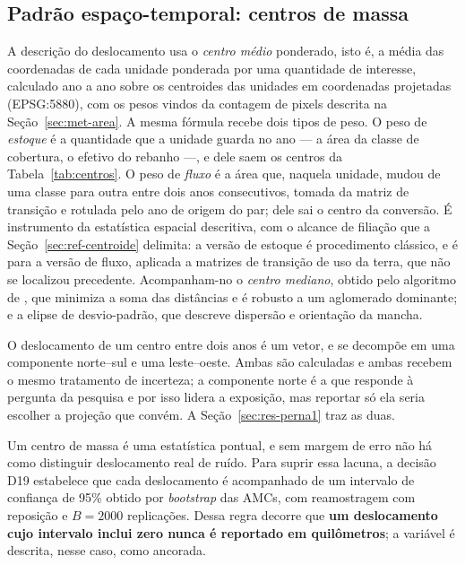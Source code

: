 \subsection{Padrão espaço-temporal: centros de massa}
\label{sec:met-centros}

A descrição do deslocamento usa o \emph{centro médio} ponderado, isto é, a
média das coordenadas de cada unidade ponderada por uma quantidade de
interesse, calculado ano a ano sobre os centroides das unidades
em coordenadas projetadas (EPSG:5880), com os pesos vindos da contagem de
pixels descrita na Seção~\ref{sec:met-area}. A mesma fórmula recebe dois tipos
de peso. O peso de \emph{estoque} é a quantidade que a unidade guarda no ano
--- a área da classe de cobertura, o efetivo do rebanho ---, e dele saem os
centros da Tabela~\ref{tab:centros}. O peso de \emph{fluxo} é a área que,
naquela unidade, mudou de uma classe para outra entre dois anos consecutivos,
tomada da matriz de transição e rotulada pelo ano de origem do par; dele sai o
centro da conversão. É
instrumento da estatística espacial descritiva, com o alcance de filiação que
a Seção~\ref{sec:ref-centroide} delimita: a versão de estoque é procedimento
clássico, e é para a versão de fluxo, aplicada a matrizes de transição de uso
da terra, que não se localizou precedente.
Acompanham-no o \emph{centro mediano}, obtido pelo algoritmo de
, que minimiza a soma das distâncias e é robusto a
um aglomerado dominante; e a elipse de desvio-padrão, que descreve dispersão e
orientação da mancha.

O deslocamento de um centro entre dois anos é um vetor, e se decompõe em uma
componente norte--sul e uma leste--oeste. Ambas são calculadas e ambas recebem
o mesmo tratamento de incerteza; a componente norte é a que responde à pergunta
da pesquisa e por isso lidera a exposição, mas reportar só ela seria escolher a
projeção que convém. A Seção~\ref{sec:res-perna1} traz as duas.

Um centro de massa é uma estatística pontual, e sem margem de erro não há como
distinguir deslocamento real de ruído. Para suprir essa lacuna, a decisão D19
estabelece que cada deslocamento é acompanhado de um intervalo de confiança de
95\% obtido por \emph{bootstrap} das AMCs, com reamostragem com reposição e $B = 2000$
replicações. Dessa regra decorre que \textbf{um deslocamento cujo intervalo inclui zero nunca é reportado em quilômetros}; a variável é descrita, nesse caso,
como ancorada.

